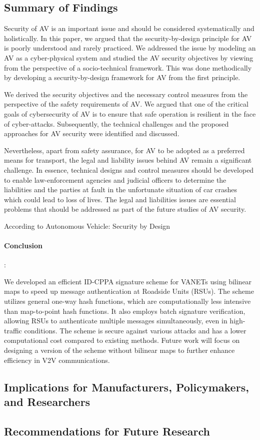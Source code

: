 \subsection{Summary of Findings}\label{subsec:summary-of-findings}
Security of AV is an important issue and should be
considered systematically and holistically. In this paper, we
argued that the security-by-design principle for AV is poorly
understood and rarely practiced. We addressed the issue by
modeling an AV as a cyber-physical system and studied the
AV security objectives by viewing from the perspective of
a socio-technical framework. This was done methodically by
developing a security-by-design framework for AV from the
first principle.

We derived the security objectives and the necessary control
measures from the perspective of the safety requirements of
AV. We argued that one of the critical goals of cybersecurity
of AV is to ensure that safe operation is resilient in the face
of cyber-attacks. Subsequently, the technical challenges and
the proposed approaches for AV security were identified and
discussed.

Nevertheless, apart from safety assurance, for AV to be
adopted as a preferred means for transport, the legal and
liability issues behind AV remain a significant challenge. In
essence, technical designs and control measures should be
developed to enable law-enforcement agencies and judicial
officers to determine the liabilities and the parties at fault in the
unfortunate situation of car crashes which could lead to loss
of lives. The legal and liabilities issues are essential problems
that should be addressed as part of the future studies of AV
security.

According to Autonomous Vehicle: Security by Design




\paragraph{Conclusion}:

We developed an efficient ID-CPPA signature scheme for VANETs using bilinear maps to speed up message authentication at Roadside Units (RSUs).
The scheme utilizes general one-way hash functions, which are computationally less intensive than map-to-point hash functions.
It also employs batch signature verification, allowing RSUs to authenticate multiple messages simultaneously, even in high-traffic conditions.
The scheme is secure against various attacks and has a lower computational cost compared to existing methods.
Future work will focus on designing a version of the scheme without bilinear maps to further enhance efficiency in V2V communications.





\subsection{Implications for Manufacturers, Policymakers, and Researchers}\label{subsec:implications-for-manufacturers-policymakers-and-researchers}
\subsection{Recommendations for Future Research}\label{subsec:recommendations-for-future-research}
